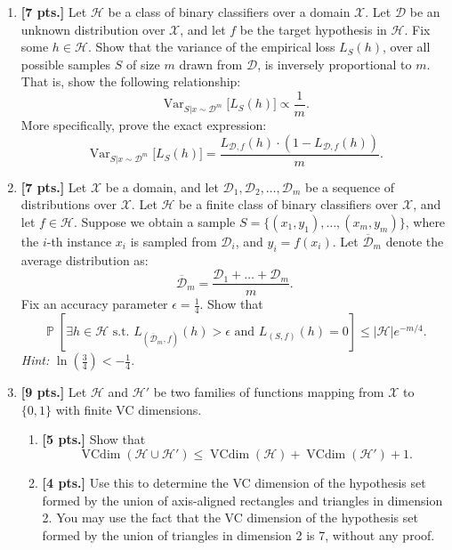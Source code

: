 \documentclass[11pt,a4paper]{article}
\DeclareMathOperator{\Var}{Var}
\DeclareMathOperator{\Pbb}{\mathbb{P}}
\DeclareMathOperator{\VCdim}{VCdim}
\begin{document}
\begin{enumerate}[label=\textbf{\arabic*.}]
    \item \textbf{[7 pts.]} Let $\mathcal{H}$ be a class of binary classifiers over a domain $\mathcal{X}$. Let $\mathcal{D}$ be an unknown distribution over $\mathcal{X}$, and let $f$ be the target hypothesis in $\mathcal{H}$. Fix some $h \in \mathcal{H}$. Show that the variance of the empirical loss $L_S(h)$, over all possible samples $S$ of size $m$ drawn from $\mathcal{D}$, is inversely proportional to $m$. That is, show the following relationship:
    \[
    \Var_{S | x \sim \mathcal{D}^m} \bigl[ L_S(h) \bigr] \propto \frac{1}{m}.
    \]
    More specifically, prove the exact expression:
    \[
    \Var_{S | x \sim \mathcal{D}^m} \bigl[ L_S(h) \bigr] = \frac{L_{\mathcal{D}, f}(h) \cdot (1 - L_{\mathcal{D}, f}(h))}{m}.
    \]

    \item \textbf{[7 pts.]} Let $\mathcal{X}$ be a domain, and let $\mathcal{D}_1, \mathcal{D}_2, \dots, \mathcal{D}_m$ be a sequence of distributions over $\mathcal{X}$. Let $\mathcal{H}$ be a finite class of binary classifiers over $\mathcal{X}$, and let $f \in \mathcal{H}$. Suppose we obtain a sample $S = \{(x_1, y_1), \dots, (x_m, y_m)\}$, where the $i$-th instance $x_i$ is sampled from $\mathcal{D}_i$, and $y_i = f(x_i)$. Let $\overline{\mathcal{D}}_m$ denote the average distribution as:
    \[
    \overline{\mathcal{D}}_m = \frac{\mathcal{D}_1 + \dots + \mathcal{D}_m}{m}.
    \]
    Fix an accuracy parameter $\epsilon = \frac{1}{4}$. Show that
    \[
    \Pbb \left[ \exists h \in \mathcal{H} \text{ s.t. } L_{(\overline{\mathcal{D}}_m, f)}(h) > \epsilon \text{ and } L_{(S, f)}(h) = 0 \right] \le |\mathcal{H}| e^{-m/4}.
    \]
    \textit{Hint:} $\ln\left(\frac{3}{4}\right) < -\frac{1}{4}$.

    \item \textbf{[9 pts.]} Let $\mathcal{H}$ and $\mathcal{H}'$ be two families of functions mapping from $\mathcal{X}$ to $\{0, 1\}$ with finite VC dimensions.
    \begin{enumerate}[label=(\a*)]
        \item \textbf{[5 pts.]} Show that
        \[
        \VCdim(\mathcal{H} \cup \mathcal{H}') \le \VCdim(\mathcal{H}) + \VCdim(\mathcal{H}') + 1.
        \]
        \item \textbf{[4 pts.]} Use this to determine the VC dimension of the hypothesis set formed by the union of axis-aligned rectangles and triangles in dimension 2. You may use the fact that the VC dimension of the hypothesis set formed by the union of triangles in dimension 2 is 7, without any proof.
    \end{enumerate}


\end{enumerate}
\end{document}
